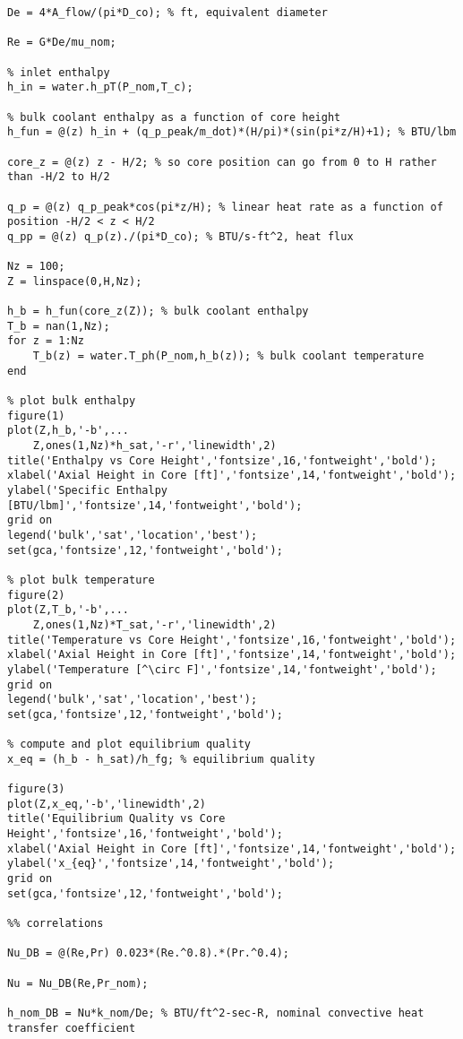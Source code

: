 \begin{fullwidth}
\begin{lstlisting}
De = 4*A_flow/(pi*D_co); % ft, equivalent diameter

Re = G*De/mu_nom; 

% inlet enthalpy
h_in = water.h_pT(P_nom,T_c);

% bulk coolant enthalpy as a function of core height
h_fun = @(z) h_in + (q_p_peak/m_dot)*(H/pi)*(sin(pi*z/H)+1); % BTU/lbm

core_z = @(z) z - H/2; % so core position can go from 0 to H rather than -H/2 to H/2

q_p = @(z) q_p_peak*cos(pi*z/H); % linear heat rate as a function of position -H/2 < z < H/2
q_pp = @(z) q_p(z)./(pi*D_co); % BTU/s-ft^2, heat flux

Nz = 100;
Z = linspace(0,H,Nz);

h_b = h_fun(core_z(Z)); % bulk coolant enthalpy
T_b = nan(1,Nz);
for z = 1:Nz
    T_b(z) = water.T_ph(P_nom,h_b(z)); % bulk coolant temperature
end

% plot bulk enthalpy
figure(1)
plot(Z,h_b,'-b',...
    Z,ones(1,Nz)*h_sat,'-r','linewidth',2)
title('Enthalpy vs Core Height','fontsize',16,'fontweight','bold');
xlabel('Axial Height in Core [ft]','fontsize',14,'fontweight','bold');
ylabel('Specific Enthalpy [BTU/lbm]','fontsize',14,'fontweight','bold');
grid on
legend('bulk','sat','location','best');
set(gca,'fontsize',12,'fontweight','bold');

% plot bulk temperature
figure(2)
plot(Z,T_b,'-b',...
    Z,ones(1,Nz)*T_sat,'-r','linewidth',2)
title('Temperature vs Core Height','fontsize',16,'fontweight','bold');
xlabel('Axial Height in Core [ft]','fontsize',14,'fontweight','bold');
ylabel('Temperature [^\circ F]','fontsize',14,'fontweight','bold');
grid on
legend('bulk','sat','location','best');
set(gca,'fontsize',12,'fontweight','bold');

% compute and plot equilibrium quality
x_eq = (h_b - h_sat)/h_fg; % equilibrium quality

figure(3)
plot(Z,x_eq,'-b','linewidth',2)
title('Equilibrium Quality vs Core Height','fontsize',16,'fontweight','bold');
xlabel('Axial Height in Core [ft]','fontsize',14,'fontweight','bold');
ylabel('x_{eq}','fontsize',14,'fontweight','bold');
grid on
set(gca,'fontsize',12,'fontweight','bold');

%% correlations

Nu_DB = @(Re,Pr) 0.023*(Re.^0.8).*(Pr.^0.4); 

Nu = Nu_DB(Re,Pr_nom);

h_nom_DB = Nu*k_nom/De; % BTU/ft^2-sec-R, nominal convective heat transfer coefficient


\end{lstlisting}
\end{fullwidth}
